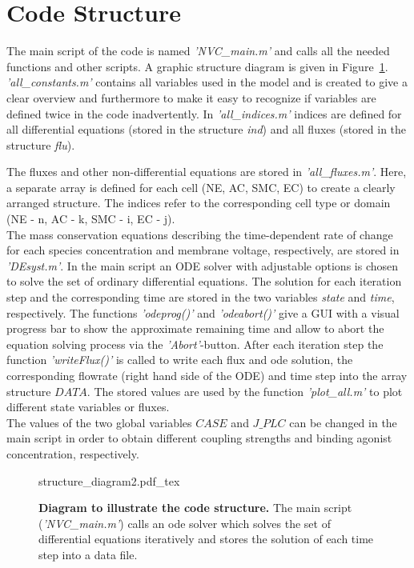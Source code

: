 \section{Code Structure}

The main script of the code is named \textit{'NVC\_main.m'} and calls all the needed functions and other scripts. A graphic structure diagram is given in Figure~\ref{fig:Structure}.\\
\textit{'all\_constants.m'} contains all variables used in the model and is created to give a clear overview and  furthermore to make it easy to recognize if variables are defined twice in the code inadvertently. In \textit{'all\_indices.m'} indices are defined for all differential equations (stored in the structure \textit{ind}) and all fluxes (stored in the structure \textit{flu}). 

The fluxes and other non-differential equations are stored in \textit{'all\_fluxes.m'}. Here, a separate array is defined for each cell (NE, AC, SMC, EC) to create a clearly arranged structure. The indices refer to the corresponding cell type or domain (NE - n, AC - k, SMC - i, EC - j).\\
The mass conservation equations describing the time-dependent rate of change for each species concentration and membrane voltage, respectively, are stored in \textit{'DEsyst.m'}. In the main script an ODE solver with adjustable options is chosen to solve the set of ordinary differential equations. The  solution for each iteration step and the corresponding time are stored in the two variables \textit{state} and \textit{time}, respectively.  The functions \textit{'odeprog()'} and \textit{'odeabort()'}  \cite{Franklin} give a GUI  with a visual progress bar to show the approximate remaining time and allow to abort the equation solving process via the \textit{'Abort'}-button. After each iteration step the function \textit{'writeFlux()'} is called to write each flux and ode solution, the corresponding flowrate (right hand side of the ODE) and time step into the array structure $DATA $. The stored values are used by the function \textit{ 'plot\_all.m'} to plot different state variables or fluxes. \\
The values of the two global variables $ CASE $ and $ J\_PLC $ can be changed in the main script in order to obtain different coupling strengths and binding agonist concentration, respectively. 

\begin{figure}[h!]
  \centering
  \def\svgwidth{450pt} %
  \footnotesize
  {structure_diagram2.pdf_tex}
  \caption{\textbf{Diagram to illustrate the code structure.} The main script (\textit{'NVC\_main.m'}) calls an ode solver which solves the set of differential equations iteratively and stores the solution of each time step into a data file.}
\label{fig:Structure}
\end{figure}




